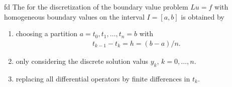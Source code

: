 \begin{Definition}{fd}
  The  for the discretization of the
  boundary value problem $Lu = f$ with homogeneous boundary values on
  the interval $I=[a,b]$ is obtained by
  \begin{enumerate}
  \item choosing a partition $a=t_0, t_1,\dots,t_n=b$ with
    \begin{gather*}
      t_{k-1}-t_k = h = (b-a)/n.
    \end{gather*}
  \item only considering the discrete solution valus $y_k$,
    $k=0,\dots,n$.
  \item replacing all differential operators by finite differences in $t_k$.
  \end{enumerate}
\end{Definition}

